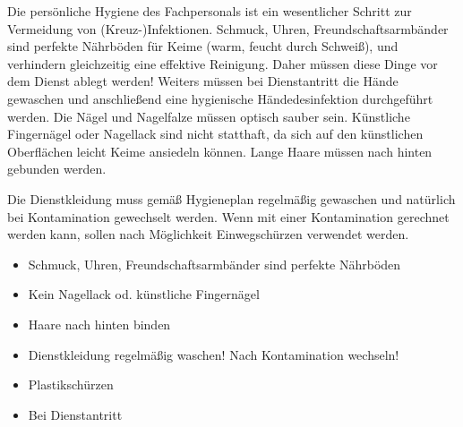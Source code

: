 {\label{topic:persoenliche-hygiene}
Die persönliche Hygiene des Fachpersonals ist ein
wesentlicher Schritt zur Vermeidung von (Kreuz-)Infektionen. 
Schmuck, Uhren, Freundschaftsarmbänder sind perfekte
    Nährböden für Keime (warm, feucht durch Schweiß), und
    verhindern gleichzeitig eine effektive Reinigung. Daher
    müssen diese Dinge vor dem Dienst
    ablegt werden! Weiters müssen bei Dienstantritt
die  Hände gewaschen und anschließend eine hygienische
Händedesinfektion durchgeführt werden. Die Nägel und Nagelfalze
müssen optisch sauber sein. Künstliche Fingernägel
oder Nagellack sind nicht statthaft, da sich auf den
künstlichen Oberflächen leicht Keime ansiedeln
können. Lange Haare müssen nach hinten gebunden werden.

Die Dienstkleidung muss gemäß Hygieneplan regelmäßig
gewaschen und natürlich bei Kontamination gewechselt werden.
Wenn mit einer Kontamination gerechnet werden kann, sollen
nach Möglichkeit Einwegschürzen verwendet werden.


}
{\begin{itemize}
    \item Schmuck, Uhren, Freundschaftsarmbänder sind perfekte
    Nährböden 
    \item Kein Nagellack od. künstliche Fingernägel
    \item Haare nach hinten binden
    \item Dienstkleidung regelmäßig waschen! Nach
    Kontamination wechseln!
    \item Plastikschürzen
    \item Bei Dienstantritt
\end{itemize}}
{}{}{}



